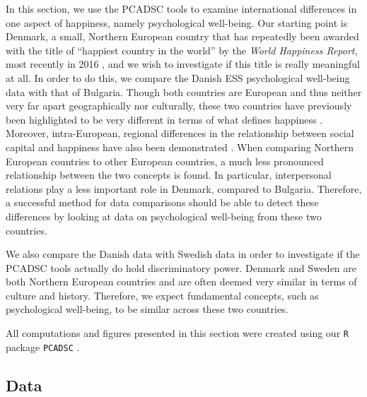 \documentclass[titlepage,11pt,twoside]{article}
\newcommand{\R}[1]{\texttt{#1}}
\begin{document}
In this section, we use the PCADSC tools to examine international differences in one aspect of happiness, namely psychological well-being. Our starting point is Denmark, a small, Northern European country that has repeatedly been awarded with the title of ``happiest country in the world''  by the \textit{World Happiness Report}, most recently in 2016 \citep{WHR2016}, and we wish to investigate if this title is really meaningful at all. In order to do this, we compare the Danish ESS psychological well-being data with that of Bulgaria. Though both countries are European and thus neither very far apart geographically nor culturally, these two countries have previously been highlighted to be very different in terms of what defines happiness \citep{ESStopline5}. Moreover, intra-European, regional differences in the relationship between social capital and happiness have also been demonstrated \citep{Rodriguez2014}. When comparing Northern European countries to other European countries, a much less pronounced relationship between the two concepts is found. In particular, interpersonal relations play a less important role in Denmark, compared to Bulgaria. Therefore, a successful method for data comparisons should be able to detect these differences by looking at data on psychological well-being from these two countries.

We also compare the Danish data with Swedish data in order to investigate if the PCADSC tools actually do hold discriminatory power. Denmark and Sweden are both Northern European countries and are often deemed very similar in terms of culture and history. Therefore, we expect fundamental concepts, such as psychological well-being, to be similar across these two countries.

All computations and figures presented in this section were created using our \R{R} package \R{PCADSC} \citep{PCADSC}. 

\subsection{Data}
\end{document}
